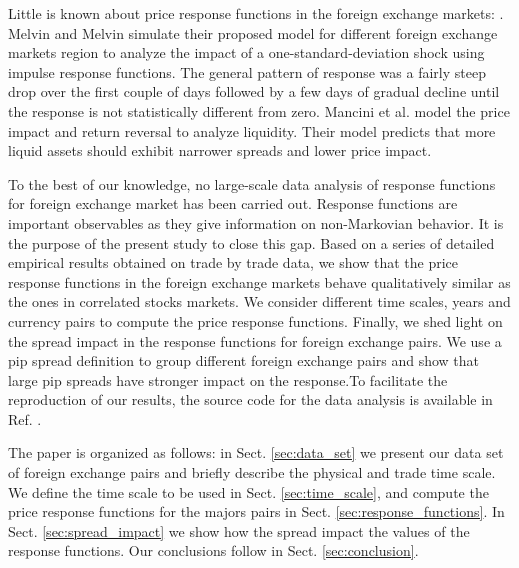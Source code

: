 Little is known about price response functions in the foreign exchange markets:
\cite{forex_liquidity,forex_volatility,response_funct_fx}. Melvin and Melvin
\cite{forex_volatility} simulate their proposed model for different foreign
exchange markets region to analyze the impact of a one-standard-deviation shock
using impulse response functions. The general pattern of response was a fairly
steep drop over the first couple of days followed by a few days of gradual
decline until the response is not statistically different from zero. Mancini et
al. \cite{forex_liquidity} model the price impact and return reversal to
analyze liquidity. Their model predicts that more liquid assets should exhibit
narrower spreads and lower price impact.

To the best of our knowledge, no large-scale data analysis of response
functions for foreign exchange market has been carried out. Response functions
are important observables as they give information on non-Markovian behavior.
It is the purpose of the present study to close this gap. Based on a series of
detailed empirical results obtained on trade by trade data, we show that the
price response functions in the foreign exchange markets behave qualitatively
similar as the ones in correlated stocks markets. We consider different time
scales, years and currency pairs to compute the price response functions.
Finally, we shed light on the spread impact in the response functions for
foreign exchange pairs. We use a pip spread definition to group different
foreign exchange pairs and show that large pip spreads have stronger impact
on the response.To facilitate the reproduction of our results, the source code
for the data analysis is available in Ref. \cite{code}.

The paper is organized as follows: in Sect. \ref{sec:data_set} we present our
data set of foreign exchange pairs and briefly describe the physical and trade
time scale. We define the time scale to be used in Sect. \ref{sec:time_scale},
and compute the price response functions for the majors pairs in Sect.
\ref{sec:response_functions}. In Sect. \ref{sec:spread_impact} we show how
the spread impact the values of the response functions. Our conclusions follow
in Sect. \ref{sec:conclusion}.